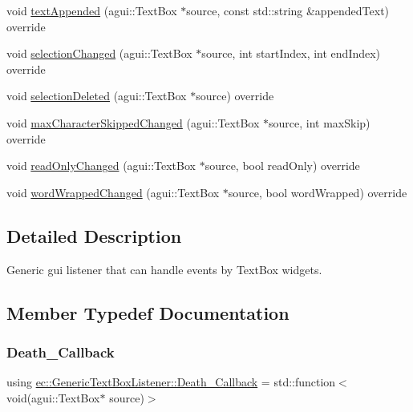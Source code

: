 \begin{DoxyCompactItemize}
\item 
void \mbox{\hyperlink{classec_1_1_generic_text_box_listener_a719c94c960a53eb5cac8c18b037ad505}{text\+Appended}} (agui\+::\+Text\+Box $\ast$source, const std\+::string \&appended\+Text) override
\item 
void \mbox{\hyperlink{classec_1_1_generic_text_box_listener_aa9446926f03c32f34212232ec81809a5}{selection\+Changed}} (agui\+::\+Text\+Box $\ast$source, int start\+Index, int end\+Index) override
\item 
void \mbox{\hyperlink{classec_1_1_generic_text_box_listener_a5f1b7490ad657f39a2a1d6270446482e}{selection\+Deleted}} (agui\+::\+Text\+Box $\ast$source) override
\item 
void \mbox{\hyperlink{classec_1_1_generic_text_box_listener_aea1d18f7bda91591408fc0408ff04284}{max\+Character\+Skipped\+Changed}} (agui\+::\+Text\+Box $\ast$source, int max\+Skip) override
\item 
void \mbox{\hyperlink{classec_1_1_generic_text_box_listener_a90daf3b875c097cd53bbf2c8b83558e3}{read\+Only\+Changed}} (agui\+::\+Text\+Box $\ast$source, bool read\+Only) override
\item 
void \mbox{\hyperlink{classec_1_1_generic_text_box_listener_a96cdc8f0e3932f1cfbe2fd6888818452}{word\+Wrapped\+Changed}} (agui\+::\+Text\+Box $\ast$source, bool word\+Wrapped) override
\end{DoxyCompactItemize}


\subsection{Detailed Description}
Generic gui listener that can handle events by Text\+Box widgets. 

\subsection{Member Typedef Documentation}
\mbox{\label{classec_1_1_generic_text_box_listener_acef5d6f448ba7f8a90e56deed9e4be68}} 
\subsubsection{\texorpdfstring{Death\+\_\+\+Callback}{Death\_Callback}}
{\footnotesize\ttfamily using \mbox{\hyperlink{classec_1_1_generic_text_box_listener_acef5d6f448ba7f8a90e56deed9e4be68}{ec\+::\+Generic\+Text\+Box\+Listener\+::\+Death\+\_\+\+Callback}} =  std\+::function$<$void(agui\+::\+Text\+Box$\ast$ source)$>$}


